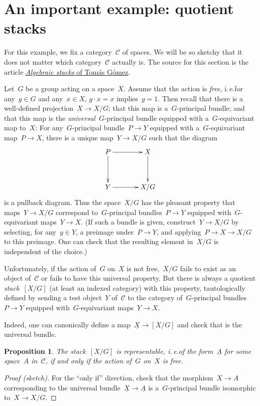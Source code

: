 \documentclass[a4paper,english,12pt]{scrartcl}
\theoremstyle{definition}
\theoremstyle{plain}
\newtheorem{prop}[defn]{Proposition}
\theoremstyle{remark}
\newcommand{\C}{\mathcal{C}}
\newcommand{\ul}[1]{\underline{#1}}
\begin{document}
\section{An important example: quotient stacks}

For this example, we fix a category~$\C$ of spaces. We will be so sketchy that
it does not matter which category~$\C$ actually is. The source for this section
is the article \href{http://arxiv.org/abs/math/9911199}{\emph{Algebraic stacks}
of Tomás Gómez}.

Let~$G$ be a group acting on a space~$X$. Assume that the action is
\emph{free}, i.\,e.\@ for any~$g \in G$ and any~$x \in X$, $g \cdot x = x$
implies~$g = 1$. Then recall that there is a well-defined projection~$X \to
X/G$; that this map is a~$G$-principal bundle; and that this map is the
\emph{universal}~$G$-principal bundle equipped with a~$G$-equivariant map
to~$X$: For any~$G$-principal bundle~$P \to Y$ equipped with a~$G$-equivariant
map~$P \to X$, there is a unique map~$Y \to X/G$ such that the diagram
\[ \xymatrixcolsep{3pc}\xymatrixrowsep{3pc}\xymatrix{
  P \ar[r] \ar[d] & X \ar[d] \\
  Y \ar[r] & X/G
} \]
is a pullback diagram. Thus the space~$X/G$ has the pleasant property that
maps~$Y \to X/G$ correspond to~$G$-principal bundles~$P \to Y$ equipped
with~$G$-equivariant maps~$Y \to X$. (If such a bundle is given, construct~$Y
\to X/G$ by selecting, for any~$y \in Y$, a preimage under~$P \to Y$, and
applying~$P \to X \to X/G$ to this preimage. One can check that the resulting
element in~$X/G$ is independent of the choice.)

Unfortunately, if the action of~$G$ on~$X$ is not free,~$X/G$ fails to exist as
an object of~$\C$ or fails to have this universal property. But there is always
a quotient \emph{stack}~$[X/G]$ (at least an indexed category) with this
property, tautologically defined by sending a test object~$Y$ of~$\C$ to the
category of~$G$-principal bundles~$P \to Y$ equipped with~$G$-equivariant
maps~$Y \to X$.

Indeed, one can canonically define a map~$\ul{X} \to [X/G]$ and check that
is the universal bundle.

\begin{prop}The stack~$[X/G]$ is representable, i.\,e.\@ of the form~$\ul{A}$
for some space~$A$ in~$\C$, if and only if the action of~$G$ on~$X$ is
free.\end{prop}
\begin{proof}[Proof (sketch)]
For the ``only if'' direction, check that the morphism~$X \to A$ corresponding
to the universal bundle~$\ul{X} \to \ul{A}$ is a~$G$-principal bundle
isomorphic to~$X \to X/G$.
\end{proof}
\end{document}
